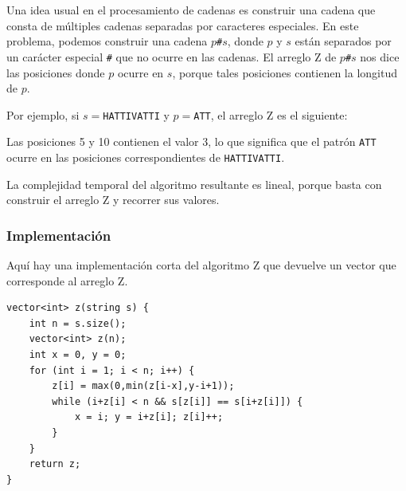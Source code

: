 Una idea usual en el procesamiento de cadenas es
construir una cadena que consta de
múltiples cadenas separadas por caracteres especiales.
En este problema, podemos construir una cadena
$p$\texttt{\#}$s$,
donde $p$ y $s$ están separados por un carácter
especial \texttt{\#} que no ocurre
en las cadenas.
El arreglo Z de $p$\texttt{\#}$s$ nos dice las posiciones
donde $p$ ocurre en $s$,
porque tales posiciones contienen la longitud de $p$.

Por ejemplo, si $s=$\texttt{HATTIVATTI} y $p=$\texttt{ATT},
el arreglo Z es el siguiente:

\begin{center}
\end{center}

Las posiciones 5 y 10 contienen el valor 3,
lo que significa que el patrón \texttt{ATT}
ocurre en las posiciones correspondientes
de \texttt{HATTIVATTI}.

La complejidad temporal del algoritmo resultante
es lineal, porque basta con construir
el arreglo Z y recorrer sus valores.

\subsubsection{Implementación}

Aquí hay una implementación corta del algoritmo Z
que devuelve un vector que corresponde al arreglo Z.

\begin{lstlisting}
vector<int> z(string s) {
    int n = s.size();
    vector<int> z(n);
    int x = 0, y = 0;
    for (int i = 1; i < n; i++) {
        z[i] = max(0,min(z[i-x],y-i+1));
        while (i+z[i] < n && s[z[i]] == s[i+z[i]]) {
            x = i; y = i+z[i]; z[i]++;
        }
    }
    return z;
}
\end{lstlisting}
